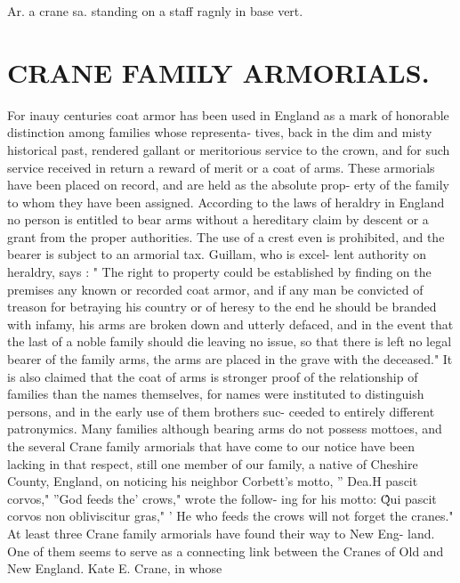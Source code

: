 \documentclass{book}
\begin{document}
Ar. a crane sa. standing on 
a staff ragnly in base vert. 



\chapter{CRANE FAMILY ARMORIALS.}


For inauy centuries coat armor has been used in England as a 
mark of honorable distinction among families whose representa- 
tives, back in the dim and misty historical past, rendered gallant 
or meritorious service to the crown, and for such service received 
in return a reward of merit or a coat of arms. These armorials 
have been placed on record, and are held as the absolute prop- 
erty of the family to whom they have been assigned. According 
to the laws of heraldry in England no person is entitled to bear 
arms without a hereditary claim by descent or a grant from the 
proper authorities. The use of a crest even is prohibited, and 
the bearer is subject to an armorial tax. Guillam, who is excel- 
lent authority on heraldry, says : " The right to property could be 
established by finding on the premises any known or recorded 
coat armor, and if any man be convicted of treason for betraying 
his country or of heresy to the end he should be branded with 
infamy, his arms are broken down and utterly defaced, and in 
the event that the last of a noble family should die leaving no 
issue, so that there is left no legal bearer of the family arms, the 
arms are placed in the grave with the deceased." It is also 
claimed that the coat of arms is stronger proof of the relationship 
of families than the names themselves, for names were instituted 
to distinguish persons, and in the early use of them brothers suc- 
ceeded to entirely different patronymics. Many families although 
bearing arms do not possess mottoes, and the several Crane family 
armorials that have come to our notice have been lacking in that 
respect, still one member of our family, a native of Cheshire 
County, England, on noticing his neighbor Corbett's motto, 
'' Dea.H pascit corvos," ''God feeds the' crows," wrote the follow- 
ing for his motto: \^\^ Qui pascit corvos non obliviscitur gras," 
' He who feeds the crows will not forget the cranes." At least 
three Crane family armorials have found their way to New Eng- 
land. One of them seems to serve as a connecting link between 
the Cranes of Old and New England. Kate E. Crane, in whose 
\end{document}
